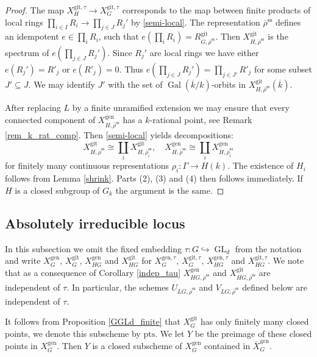 \documentclass{amsart}
\theoremstyle{definition}
\theoremstyle{remark}
\DeclareMathOperator{\GL}{GL}
\DeclareMathOperator{\Gal}{Gal}
\newcommand{\rhobar}{\overline{\rho}}
\newcommand{\gen}{\mathrm{gen}}
\newcommand{\gps}{\mathrm{git}}
\newcommand{\XgenG}{X^{\gen}_G}
\newcommand{\XbargenG}{\overline{X}^{\gen}_G}
\newcommand{\XgpsG}{X^{\gps}_{G}}
\newcommand{\pts}{\mathrm{pts}}
\newcommand{\kbar}{\overline{k}}
\newcommand{\rhobarss}{\rhobar^{\mathrm{ss}}}
\begin{document}
\begin{proof} The map $X^{\gps,\tau}_H \rightarrow X^{\gps,\tau}_G$ corresponds to the map 
between finite products of local rings $\prod_{i\in I} R_i \rightarrow \prod_{j\in J} R_j'$ by \eqref{semi-local}. The representation $\rhobarss$ defines an idempotent $e\in\prod_i R_i$, such that 
$e(\prod_i R_i)= R^{\gps}_{G, \rhobarss}$. Then $X^{\gps}_{H, \rhobarss}$ is the 
spectrum of $e(\prod_{j\in J} R_j')$. 
Since $R_j'$ are local rings we have either $e(R_j')=R'_j$ or $e(R'_j)=0$. Thus $e(\prod_{j\in J} R_j')=
\prod_{j\in J'} R'_j$ for some subset $J'\subseteq J$. We may identify $J'$ with the
set of $\Gal(\kbar/k)$-orbits in $X^{\gps}_{H, \rhobarss}(\kbar)$.

After replacing $L$ by a finite unramified extension we may ensure that every 
connected component of $X^{\gen}_{H, \rhobarss}$ has a $k$-rational point, see 
Remark \ref{rem_k_rat_comp}. Then \eqref{semi-local} yields decompositions:
$$X^{\gps}_{H, \rhobarss}\cong \coprod_i X^{\gps}_{H, \rhobar^{\mathrm{ss}}_i},\quad X^{\gen}_{H, \rhobarss}\cong \coprod_i X^{\gen}_{H, \rhobar^{\mathrm{ss}}_i}$$
for finitely many continuous representations $\rho_i:\Gamma \rightarrow H(k)$.
The existence of $H_i$ follows from Lemma \ref{shrink}. Parts (2), (3) and (4) then follows immediately. If $H$ is a closed subgroup of $G_k$ the argument is the same.
\end{proof}
 

\subsection{Absolutely irreducible locus}\label{sec_abs_irr_loc} In this subsection we omit the fixed embedding 
$\tau:G\hookrightarrow \GL_d$ from the notation and write $X^{\gen}_G$, $X^{\gps}_G$, 
$X^{\gen}_{HG}$ and $X^{\gps}_{HG}$ for $X^{\gen,\tau}_G$, $X^{\gps,\tau}_G$, 
$X^{\gen,\tau}_{HG}$ 
and $X^{\gps,\tau}_{HG}$. We note that as a consequence of Corollary \ref{indep_tau} 
$X^{\gen}_{HG,\rhobarss}$ and $X^{\gps}_{HG,\rhobarss}$ are independent of $\tau$. In particular, 
the schemes $U_{LG,\rhobarss}$ and $V_{LG, \rhobarss}$ defined below are independent of $\tau$. 

It follows from Proposition \ref{GGLd_finite} that $\XgpsG$ has only finitely many closed 
points, we denote this subscheme by $\pts$. We let $Y$ be the preimage of these 
closed points in $\XgenG$. Then $Y$ is a closed 
subscheme  of $\XgenG$ contained in $\XbargenG$. 
\end{document}

